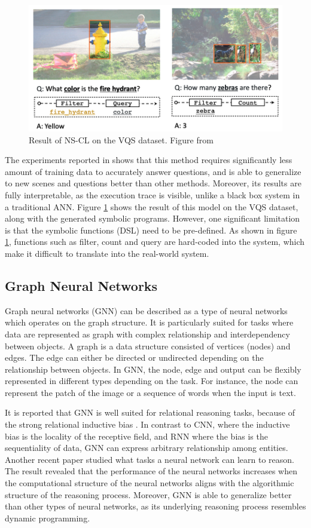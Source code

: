 \documentclass[journal]{IEEEtran}
\begin{document}
\begin{figure}[htb]
  \centering
  \includegraphics[width=0.8\columnwidth]{nscl.png}
  \caption{Result of NS-CL on the VQS dataset. Figure from \cite{Mao2019NeuroSymbolic}}
  \label{nscl}
\end{figure}

The experiments reported in \cite{Mao2019NeuroSymbolic} shows that this method requires significantly less amount of training data to accurately answer questions, 
and is able to generalize to new scenes and questions better than other methods. 
Moreover, its results are fully interpretable, as the execution trace is visible, 
unlike a black box system in a traditional ANN.
Figure \ref{nscl} shows the result of this model on the VQS dataset, along with the generated symbolic programs. 
However, one significant limitation is that the symbolic functions (DSL) need to be pre-defined. 
As shown in figure \ref{nscl}, functions such as filter, count and query are hard-coded into the system, 
which make it difficult to translate into the real-world system.

\subsection{Graph Neural Networks}

Graph neural networks (GNN) can be described as a type of neural networks which operates on the graph structure.
It is particularly suited for tasks where data are represented as graph with complex relationship and interdependency between objects.
A graph is a data structure consisted of vertices (nodes) and edges.
The edge can either be directed or undirected depending on the relationship between objects.
In GNN, the node, edge and output can be flexibly represented in different types depending on the task. 
For instance, the node can represent the patch of the image or a sequence of words when the input is text.

It is reported that GNN is well suited for relational reasoning tasks, because of the strong relational inductive bias \cite{graphnetworks}.
In contrast to CNN, where the inductive bias is the locality of the receptive field, 
and RNN where the bias is the sequentiality of data, GNN can express arbitrary relationship among entities. 
Another recent paper \cite{xu2019can} studied what tasks a neural network can learn to reason. 
The result revealed that the performance of the neural networks increases
when the computational structure of the neural networks aligns with the algorithmic structure of the reasoning process. 
Moreover, GNN is able to generalize better than other types of neural networks, 
as its underlying reasoning process resembles dynamic programming.
\end{document}
